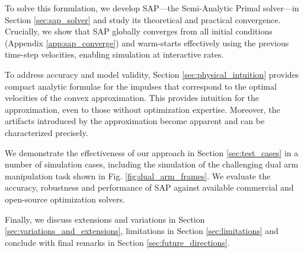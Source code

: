 To solve this formulation, we develop SAP---the Semi-Analytic Primal solver---in
Section \ref{sec:sap_solver} and study its theoretical and practical
convergence.  Crucially, we show that SAP globally converges from all initial
conditions (Appendix \ref{app:sap_converge}) and warm-starts effectively using
the previous time-step velocities, enabling simulation at interactive rates.

To address accuracy and model validity,
Section \ref{sec:physical_intuition} provides compact analytic formulae for the
impulses that correspond to the optimal velocities of the convex approximation.
This provides intuition for the approximation, even to those without
optimization expertise. Moreover, the artifacts introduced by the approximation
become apparent and can be characterized precisely. 

We demonstrate the effectiveness of our approach in Section \ref{sec:test_cases}
in a number of simulation cases, including the simulation of the challenging
dual arm manipulation task shown in Fig. \ref{fig:dual_arm_frames}. We evaluate
the accuracy, robustness and performance of SAP against available commercial and
open-source optimization solvers.

Finally, we discuss extensions and variations in Section
\ref{sec:variations_and_extensions}, limitations in Section
\ref{sec:limitations} and conclude with final remarks in Section
\ref{sec:future_directions}.

